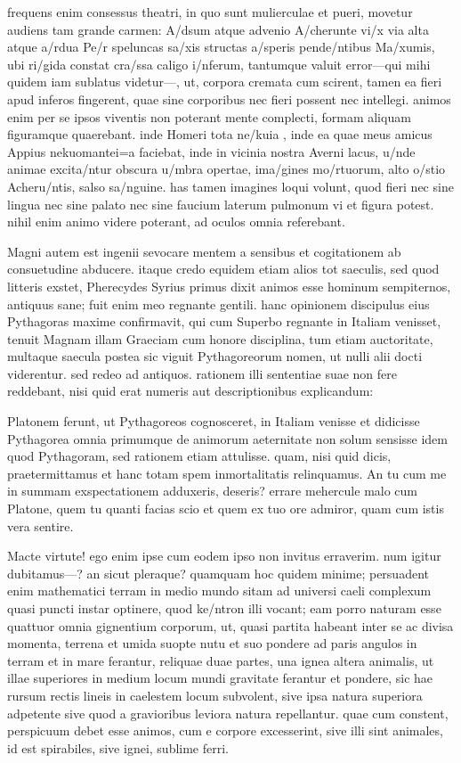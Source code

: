  frequens enim consessus theatri, in quo sunt mulierculae et pueri, movetur audiens tam grande carmen: A/dsum atque advenio A/cherunte vi/x via alta atque a/rdua Pe/r speluncas sa/xis structas a/speris pende/ntibus Ma/xumis, ubi ri/gida constat cra/ssa caligo i/nferum, tantumque valuit error—qui mihi quidem iam sublatus videtur—, ut, corpora cremata cum scirent, tamen ea fieri apud inferos fingerent, quae sine corporibus nec fieri possent nec intellegi. animos enim per se ipsos viventis non poterant mente complecti, formam aliquam figuramque quaerebant. inde Homeri tota ne/kuia , inde ea quae meus amicus Appius nekuomantei=a faciebat, inde in vicinia nostra Averni lacus, u/nde animae excita/ntur obscura u/mbra opertae, ima/gines mo/rtuorum, alto o/stio Acheru/ntis, salso sa/nguine. has tamen imagines loqui volunt, quod fieri nec sine lingua nec sine palato nec sine faucium laterum pulmonum vi et figura potest. nihil enim animo videre poterant, ad oculos omnia referebant.

 Magni autem est ingenii sevocare mentem a sensibus et cogitationem ab consuetudine abducere. itaque credo equidem etiam alios tot saeculis, sed quod litteris exstet, Pherecydes Syrius primus dixit animos esse hominum sempiternos, antiquus sane; fuit enim meo regnante gentili. hanc opinionem discipulus eius Pythagoras maxime confirmavit, qui cum Superbo regnante in Italiam venisset, tenuit Magnam illam Graeciam cum honore disciplina, tum etiam auctoritate, multaque saecula postea sic viguit Pythagoreorum nomen, ut nulli alii docti viderentur. sed redeo ad antiquos. rationem illi sententiae suae non fere reddebant, nisi quid erat numeris aut descriptionibus explicandum:

 Platonem ferunt, ut Pythagoreos cognosceret, in Italiam venisse et didicisse Pythagorea omnia primumque de animorum aeternitate non solum sensisse idem quod Pythagoram, sed rationem etiam attulisse. quam, nisi quid dicis, praetermittamus et hanc totam spem inmortalitatis relinquamus. An tu cum me in summam exspectationem adduxeris, deseris? errare mehercule malo cum Platone, quem tu quanti facias scio et quem ex tuo ore admiror, quam cum istis vera sentire.

 Macte virtute! ego enim ipse cum eodem ipso non invitus erraverim. num igitur dubitamus—? an sicut pleraque? quamquam hoc quidem minime; persuadent enim mathematici terram in medio mundo sitam ad universi caeli complexum quasi puncti instar optinere, quod ke/ntron illi vocant; eam porro naturam esse quattuor omnia gignentium corporum, ut, quasi partita habeant inter se ac divisa momenta, terrena et umida suopte nutu et suo pondere ad paris angulos in terram et in mare ferantur, reliquae duae partes, una ignea altera animalis, ut illae superiores in medium locum mundi gravitate ferantur et pondere, sic hae rursum rectis lineis in caelestem locum subvolent, sive ipsa natura superiora adpetente sive quod a gravioribus leviora natura repellantur. quae cum constent, perspicuum debet esse animos, cum e corpore excesserint, sive illi sint animales, id est spirabiles, sive ignei, sublime ferri.


